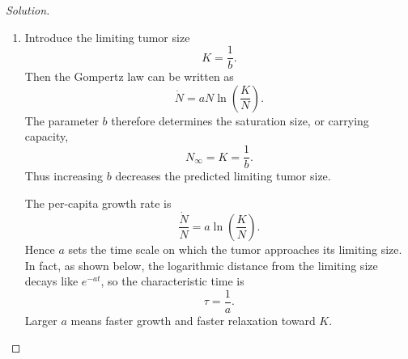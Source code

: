\documentclass[10pt]{amsart}
\newenvironment{solution}
{\begin{proof}[Solution]}
{\end{proof}}
\begin{document}
\begin{onehalfspace}
\begin{solution}
            \begin{enumerate}[label=\alph*)]
                \item Introduce the limiting tumor size
                \[
                    K=\frac1b.
                \]
                Then the Gompertz law can be written as
                \[
                    \dot N=aN\ln\left(\frac{K}{N}\right).
                \]
                The parameter $b$ therefore determines the saturation size, or carrying
                capacity,
                \[
                    \boxed{N_\infty=K=\frac1b.}
                \]
                Thus increasing $b$ decreases the predicted limiting tumor size.

                The per-capita growth rate is
                \[
                    \frac{\dot N}{N}=a\ln\left(\frac{K}{N}\right).
                \]
                Hence $a$ sets the time scale on which the tumor approaches its limiting
                size. In fact, as shown below, the logarithmic distance from the limiting
                size decays like $e^{-at}$, so the characteristic time is
                \[
                    \boxed{\tau=\frac1a.}
                \]
                Larger $a$ means faster growth and faster relaxation toward $K$.


\end{enumerate}
\end{solution}
\end{onehalfspace}
\end{document}
